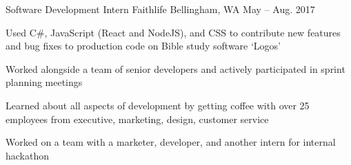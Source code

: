 

\begin{cventries}

  \cventry
    {Software Development Intern} %
    {Faithlife} %
    {Bellingham, WA} %
    {May – Aug. 2017} %
    {
      \begin{cvitems} %
        \item {Used C\#, JavaScript (React and NodeJS), and CSS to contribute new features and bug fixes to production code on Bible study software `Logos'}
        \item {Worked alongside a team of senior developers and actively participated in sprint planning meetings}
        \item {Learned about all aspects of development by getting coffee with over 25 employees from executive, marketing, design, customer service}
        \item {Worked on a team with a marketer, developer, and another intern for internal hackathon}
      \end{cvitems}
    }

\end{cventries}
